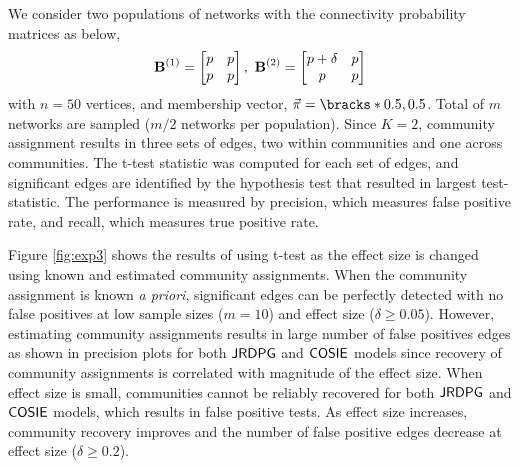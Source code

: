 We consider two populations of networks with the connectivity probability matrices as below, 
\begin{align*}
\operatorname{\mathbf{B}}^{(1)} = 
    \begin{bmatrix}
    p & p \\ p & p
    \end{bmatrix},~
\operatorname{\mathbf{B}}^{(2)} = 
    \begin{bmatrix}
    p+\delta & p \\ p & p
    \end{bmatrix}
\end{align*}
with $n=50$ vertices, and membership vector, $\vec{\pi} = \bracks*{0.5, 0.5}$. Total of $m$ networks are sampled ($m/2$ networks per population). Since $K=2$, community assignment results in three sets of edges, two within communities and one across communities. The t-test statistic was computed for each set of edges, and significant edges are identified by the hypothesis test that resulted in largest test-statistic. The performance is measured by precision, which measures false positive rate, and recall, which measures true positive rate.

Figure \ref{fig:exp3} shows the results of using t-test as the effect size is changed using known and estimated community assignments. When the community assignment is known \textit{a priori}, significant edges can be perfectly detected with no false positives at low sample sizes ($m=10$) and effect size ($\delta \geq 0.05$). However, estimating community assignments results in large number of false positives edges as shown in precision plots for both $\operatorname{\mathsf{JRDPG}}$ and $\operatorname{\mathsf{COSIE}}$ models since recovery of community assignments is correlated with magnitude of the effect size. When effect size is small, communities cannot be reliably recovered for both $\operatorname{\mathsf{JRDPG}}$ and $\operatorname{\mathsf{COSIE}}$ models, which results in false positive tests. As effect size increases, community recovery improves and the number of false positive edges decrease at effect size ($\delta \geq 0.2$). 

